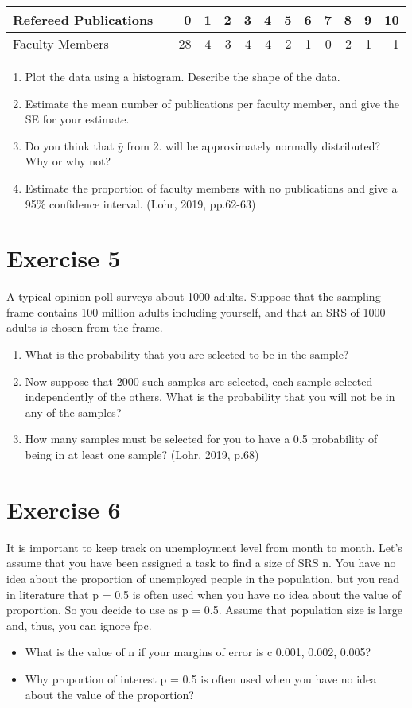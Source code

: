 \documentclass[12pt]{article}
\begin{document}
\begin{center}
\begin{tabular}{lrrrrrrrrrrrr}
Refereed Publications & \vline & 0& 1& 2& 3& 4& 5& 6& 7& 8& 9& 10 \\
\hline
Faculty Members & \vline &  28& 4& 3& 4& 4& 2& 1& 0& 2& 1& 1\\
\end{tabular}
\end{center}

\begin{enumerate}
\item Plot the data using a histogram. Describe the shape of the data.
\item Estimate the mean number of publications per faculty member, and give the SE for your estimate.
\item Do you think that $\bar{y}$ from 2. will be approximately normally distributed? Why or why not?
\item Estimate the proportion of faculty members with no publications and give a 95\% confidence interval. \hfill (Lohr, 2019, pp.62-63)
\end{enumerate}

\section*{Exercise 5}
A typical opinion poll surveys about 1000 adults. Suppose that the sampling frame contains 100 million adults including yourself, and that an SRS of 1000 adults is chosen from the frame.
\begin{enumerate}
\item What is the probability that you are selected to be in the sample?
\item Now suppose that 2000 such samples are selected, each sample selected independently of the others. What is the probability that you will not be in any of the
samples?
\item How many samples must be selected for you to have a 0.5 probability of being in at least one sample?
\hfill (Lohr, 2019, p.68)
\end{enumerate}

\section*{Exercise 6}
It is important to keep track on unemployment level from month to month. Let’s assume that you have been assigned a task to find a size of SRS n. You have no idea about the proportion of unemployed people in the population, but you read in literature that p = 0.5 is often used when you have no idea about the value of proportion. So you decide to use as p = 0.5. Assume that population size is large and, thus, you can ignore fpc.
\begin{itemize}
\item What is the value of n if your margins of error is c 0.001, 0.002, 0.005? 
\item	Why proportion of interest p = 0.5 is often used when you have no idea about the value of the proportion?
\end{itemize}
\end{document}
